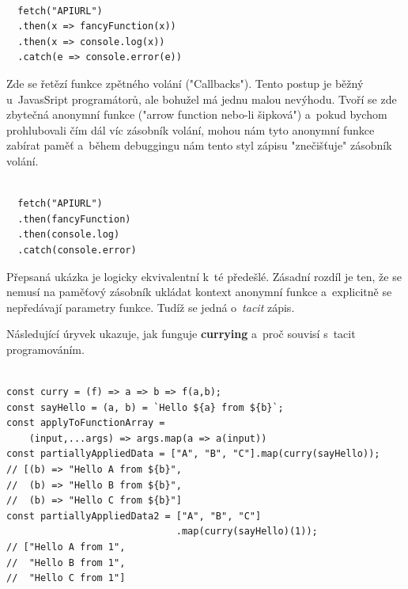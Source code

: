 \documentclass[male, czech]{kithesis}
\newenvironment{code}{\captionsetup{type=listing}}{}
\begin{document}
\begin{code}
\begin{verbatim}

  fetch("APIURL")
  .then(x => fancyFunction(x))
  .then(x => console.log(x))
  .catch(e => console.error(e))

\end{verbatim}
\end{code}

Zde se řetězí funkce zpětného volání ("Callbacks"). 
Tento postup je běžný u~JavasSript programátorů,
ale bohužel má jednu malou nevýhodu.
Tvoří se zde zbytečná anonymní funkce ("arrow function nebo-li šipková") 
a~pokud bychom prohlubovali čím dál víc zásobník volání,
mohou nám tyto anonymní funkce zabírat paměť
a~během debuggingu nám tento styl zápisu "znečišťuje" 
zásobník volání. 

\newpage

\begin{code}
\begin{verbatim}

  fetch("APIURL")
  .then(fancyFunction)
  .then(console.log)
  .catch(console.error)

\end{verbatim}
\end{code}

Přepsaná ukázka je logicky ekvivalentní k~té předešlé. 
Zásadní rozdíl je ten, 
že se nemusí na paměťový zásobník ukládat kontext anonymní funkce 
a~explicitně se nepředávají parametry funkce. 
Tudíž se jedná o~\textit{tacit} zápis.

Následující úryvek ukazuje, 
jak funguje \textbf{currying} a~proč souvisí s~tacit programováním.

\begin{code}
\begin{verbatim}

const curry = (f) => a => b => f(a,b);
const sayHello = (a, b) = `Hello ${a} from ${b}`;
const applyToFunctionArray = 
    (input,...args) => args.map(a => a(input))
const partiallyAppliedData = ["A", "B", "C"].map(curry(sayHello)); 
// [(b) => "Hello A from ${b}", 
//  (b) => "Hello B from ${b}", 
//  (b) => "Hello C from ${b}"]
const partiallyAppliedData2 = ["A", "B", "C"]
                              .map(curry(sayHello)(1)); 
// ["Hello A from 1", 
//  "Hello B from 1", 
//  "Hello C from 1"]

\end{verbatim}
\end{code}
\end{document}
